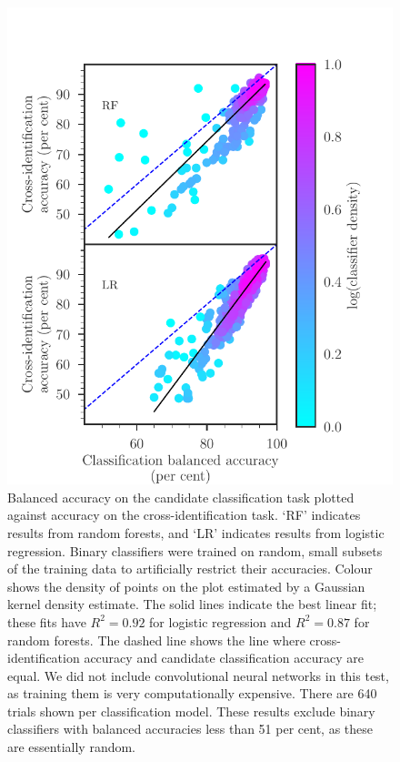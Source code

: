 \documentclass[fleqn,usenatbib,usedcolumn]{mnras}
\newcommand{\edited}[1]{#1}
\begin{document}
    \begin{figure}
      \centering
      \includegraphics[width=\columnwidth]{images/gct-to-xid.pdf}
      \caption{Balanced accuracy on the candidate classification task plotted
      against accuracy on the cross-identification task. `RF' indicates
      results from random forests, and `LR' indicates results from logistic
      regression. Binary classifiers were trained on random, small subsets of the
      training data to artificially restrict their accuracies. Colour shows
      the density of points on the plot estimated by a Gaussian kernel density
      estimate. The solid lines indicate the best linear fit; these fits have
      $R^2 = 0.92$ for logistic regression and $R^2 = 0.87$ for random
      forests.
      \edited{The dashed line shows the line where cross-identification accuracy and candidate classification accuracy are equal.}
      We did not include convolutional neural networks in this test,
      as training them is very computationally expensive. There are 640 trials shown per classification model. These results
      exclude binary classifiers with balanced accuracies less than 51 per cent, as
      these are essentially random.
      \label{fig:gct-to-xid}}
    \end{figure}
\end{document}
